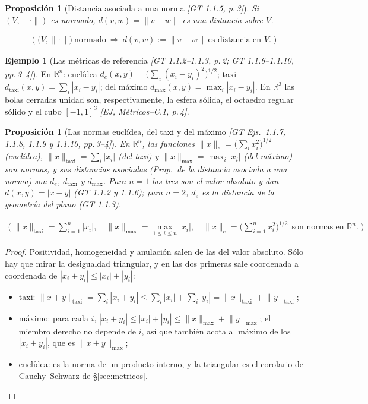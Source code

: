 \documentclass[11pt,a4paper]{article}
\newenvironment{lista}{\leavevmode\begin{itemize}[leftmargin=1.5em,itemsep=1pt,topsep=2pt,parsep=0pt]}{\end{itemize}}
\newcommand{\lgc}[1]{\par\vspace{-3pt}\begin{gather*}\big(\;#1\;\big)\end{gather*}\vspace{-6pt}}
\theoremstyle{definition}
\newtheorem{ejemplo}[definicion]{Ejemplo}
\theoremstyle{plain}
\newtheorem{proposicion}[definicion]{Proposición}
\newcommand{\fnt}[1]{{\normalfont\small\itshape\color{gray!150!black}[#1]}}
\newcommand{\R}{\mathbb{R}}
\newcommand{\norm}[1]{\lVert #1 \rVert}
\begin{document}
\begin{proposicion}[Distancia asociada a una norma \fnt{GT 1.1.5, p.\,3}]
Si $(V,\norm{\cdot})$ es normado, $d(v,w)=\norm{v-w}$ es una distancia sobre $V$.
\lgc{\big(V,\norm{\cdot}\big)\ \text{normado}\ \Rightarrow\ d(v,w):=\norm{v-w}\ \text{es distancia en } V.}
\end{proposicion}

\begin{ejemplo}[Las métricas de referencia \fnt{GT 1.1.2--1.1.3, p.\,2; GT 1.1.6--1.1.10, pp.\,3--4}]
En $\R^n$: euclídea $d_e(x,y)=\big(\sum_i (x_i-y_i)^2\big)^{1/2}$; taxi $d_{\text{taxi}}(x,y)=\sum_i|x_i-y_i|$; del máximo $d_{\max}(x,y)=\max_i |x_i-y_i|$. En $\R^3$ las bolas cerradas unidad son, respectivamente, la esfera sólida, el octaedro regular sólido y el cubo $[-1,1]^3$ \fnt{EJ, Métricos--C.1, p.\,4}.
\end{ejemplo}

\begin{proposicion}[Las normas euclídea, del taxi y del máximo \fnt{GT Ejs.\ 1.1.7, 1.1.8, 1.1.9 y 1.1.10, pp.\,3--4}]\label{hu:normasRn}
En $\R^n$, las funciones $\norm{x}_e=\big(\sum_i x_i^2\big)^{1/2}$ (euclídea), $\norm{x}_{\text{taxi}}=\sum_i|x_i|$ (del taxi) y $\norm{x}_{\max}=\max_i|x_i|$ (del máximo) son normas, y sus distancias asociadas (Prop.\ de la distancia asociada a una norma) son $d_e$, $d_{\text{taxi}}$ y $d_{\max}$. Para $n=1$ las tres son el valor absoluto y dan $d(x,y)=|x-y|$ (GT 1.1.2 y 1.1.6); para $n=2$, $d_e$ es la distancia de la geometría del plano (GT 1.1.3).
\lgc{\norm{x}_{\text{taxi}}=\sum_{i=1}^{n}|x_i|,\quad \norm{x}_{\max}=\max_{1\le i\le n}|x_i|,\quad \norm{x}_e=\Big(\sum_{i=1}^{n}x_i^2\Big)^{1/2}\ \ \text{son normas en }\R^n.}
\end{proposicion}

\begin{proof}
Positividad, homogeneidad y anulación salen de las del valor absoluto. Sólo hay que mirar la desigualdad triangular, y en las dos primeras sale coordenada a coordenada de $|x_i+y_i|\le|x_i|+|y_i|$:
\begin{lista}
\item taxi: $\norm{x+y}_{\text{taxi}}=\sum_i|x_i+y_i|\le\sum_i|x_i|+\sum_i|y_i|=\norm{x}_{\text{taxi}}+\norm{y}_{\text{taxi}}$;
\item máximo: para cada $i$, $|x_i+y_i|\le|x_i|+|y_i|\le\norm{x}_{\max}+\norm{y}_{\max}$; el miembro derecho no depende de $i$, así que también acota al máximo de los $|x_i+y_i|$, que es $\norm{x+y}_{\max}$;
\item euclídea: es la norma de un producto interno, y la triangular es el corolario de Cauchy--Schwarz de \S\ref{sec:metricos}.
\end{lista}
\end{proof}
\end{document}
